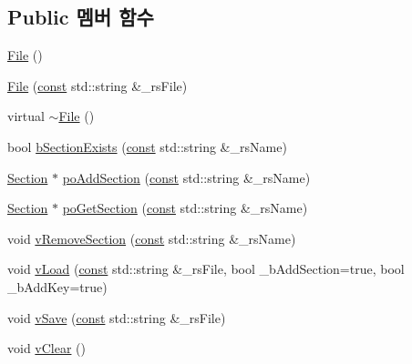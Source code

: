 \subsection*{Public 멤버 함수}
\begin{DoxyCompactItemize}
\item 
\mbox{\hyperlink{class_v_b_a_1_1_config_1_1_file_a6ef03ec96b70ff959da2098dc76e3b16}{File}} ()
\item 
\mbox{\hyperlink{class_v_b_a_1_1_config_1_1_file_a5f76dd130a9c0eff526dfd0fbeaa9e44}{File}} (\mbox{\hyperlink{getopt1_8c_a2c212835823e3c54a8ab6d95c652660e}{const}} std\+::string \&\+\_\+rs\+File)
\item 
virtual \mbox{\hyperlink{class_v_b_a_1_1_config_1_1_file_a450d205e5b9934238ab8bb9dee54ec52}{$\sim$\+File}} ()
\item 
bool \mbox{\hyperlink{class_v_b_a_1_1_config_1_1_file_a1c449716812ae76ece9dd315a89da8ff}{b\+Section\+Exists}} (\mbox{\hyperlink{getopt1_8c_a2c212835823e3c54a8ab6d95c652660e}{const}} std\+::string \&\+\_\+rs\+Name)
\item 
\mbox{\hyperlink{class_v_b_a_1_1_config_1_1_section}{Section}} $\ast$ \mbox{\hyperlink{class_v_b_a_1_1_config_1_1_file_a8a785523724a50c1d40a50ea6ada6a4c}{po\+Add\+Section}} (\mbox{\hyperlink{getopt1_8c_a2c212835823e3c54a8ab6d95c652660e}{const}} std\+::string \&\+\_\+rs\+Name)
\item 
\mbox{\hyperlink{class_v_b_a_1_1_config_1_1_section}{Section}} $\ast$ \mbox{\hyperlink{class_v_b_a_1_1_config_1_1_file_a0de8f36155786c73b91a22e62df27958}{po\+Get\+Section}} (\mbox{\hyperlink{getopt1_8c_a2c212835823e3c54a8ab6d95c652660e}{const}} std\+::string \&\+\_\+rs\+Name)
\item 
void \mbox{\hyperlink{class_v_b_a_1_1_config_1_1_file_a4b9de49a799dc1e4de38710669127710}{v\+Remove\+Section}} (\mbox{\hyperlink{getopt1_8c_a2c212835823e3c54a8ab6d95c652660e}{const}} std\+::string \&\+\_\+rs\+Name)
\item 
void \mbox{\hyperlink{class_v_b_a_1_1_config_1_1_file_ac70f83e5efe3c2d7a66de7227099803b}{v\+Load}} (\mbox{\hyperlink{getopt1_8c_a2c212835823e3c54a8ab6d95c652660e}{const}} std\+::string \&\+\_\+rs\+File, bool \+\_\+b\+Add\+Section=true, bool \+\_\+b\+Add\+Key=true)
\item 
void \mbox{\hyperlink{class_v_b_a_1_1_config_1_1_file_a95ce8b60e20b58e730d9987843cba5a4}{v\+Save}} (\mbox{\hyperlink{getopt1_8c_a2c212835823e3c54a8ab6d95c652660e}{const}} std\+::string \&\+\_\+rs\+File)
\item 
void \mbox{\hyperlink{class_v_b_a_1_1_config_1_1_file_aab1ab602f9eafb2ea1cd981a2953756d}{v\+Clear}} ()

\end{DoxyCompactItemize}
